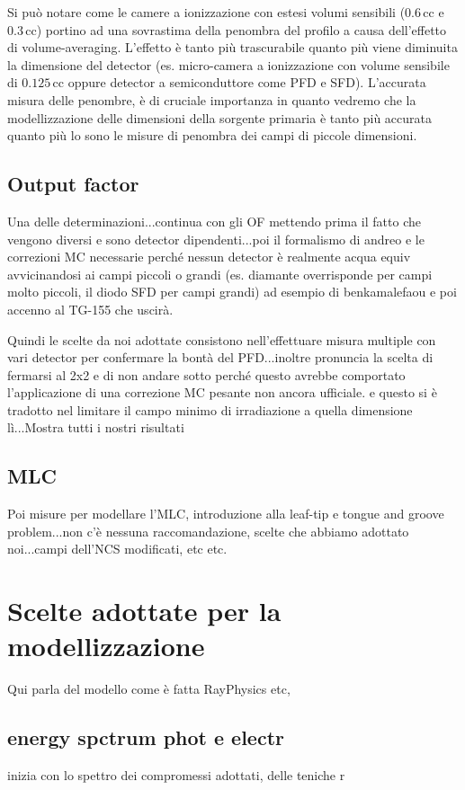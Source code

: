 Si può notare come le camere a ionizzazione con estesi volumi sensibili ($0.6\,$cc e $0.3\,$cc) portino ad una sovrastima della penombra del profilo a causa dell'effetto di volume-averaging. L'effetto è tanto più trascurabile quanto più viene diminuita la dimensione del detector (es. micro-camera a ionizzazione con volume sensibile di $0.125\,$cc oppure detector a semiconduttore come PFD e SFD). L'accurata misura delle penombre, è di cruciale importanza in quanto vedremo che la modellizzazione delle dimensioni della sorgente primaria è tanto più accurata quanto più lo sono le misure di penombra dei campi di piccole dimensioni.

\subsection{Output factor}


Una delle determinazioni...continua con gli OF mettendo prima il fatto che vengono diversi e sono detector dipendenti...poi il formalismo di andreo e le correzioni MC necessarie perché nessun detector è realmente acqua equiv avvicinandosi ai campi piccoli o grandi (es. diamante overrisponde per campi molto piccoli, il diodo SFD per campi grandi) ad esempio di benkamalefaou e poi accenno al TG-155 che uscirà.

Quindi le scelte da noi adottate consistono nell'effettuare misura multiple con vari detector per confermare la bontà del PFD...inoltre pronuncia la scelta di fermarsi al 2x2 e di non andare sotto perché questo avrebbe comportato l'applicazione di una correzione MC pesante non ancora ufficiale. e questo si è tradotto nel limitare il campo minimo di irradiazione a quella dimensione lì...Mostra tutti i nostri risultati


\subsection{MLC}
Poi misure per modellare l'MLC, introduzione alla leaf-tip e tongue and groove problem...non c'è nessuna raccomandazione, scelte che abbiamo adottato noi...campi dell'NCS modificati, etc etc.



\section{Scelte adottate per la modellizzazione}
Qui parla del modello come è fatta RayPhysics etc,
\subsection{energy spctrum phot e electr}
inizia con lo spettro dei compromessi adottati, delle teniche r

